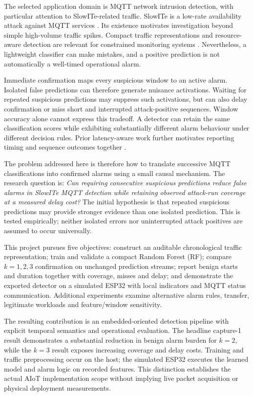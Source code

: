 \documentclass[conference]{IEEEtran}
\begin{document}
The selected application domain is MQTT network intrusion detection,
with particular attention to SlowITe-related traffic. SlowITe is a
low-rate availability attack against MQTT services
\cite{vaccari2020slow}. Its existence motivates investigation beyond
simple high-volume traffic spikes. Compact traffic representations
and resource-aware detection are relevant for constrained monitoring
systems \cite{alfayoumi2023,gavric2024}. Nevertheless, a lightweight
classifier can make mistakes, and a positive prediction is not
automatically a well-timed operational alarm.

Immediate confirmation maps every suspicious window to an active
alarm. Isolated false predictions can therefore generate nuisance
activations. Waiting for repeated suspicious predictions may suppress
such activations, but can also delay confirmation or miss short and
interrupted attack-positive sequences. Window accuracy alone cannot
express this tradeoff. A detector can retain the same classification
scores while exhibiting substantially different alarm behaviour
under different decision rules. Prior latency-aware work further
motivates reporting timing and sequence outcomes together
\cite{puccetti2026}.

The problem addressed here is therefore how to translate successive
MQTT classifications into confirmed alarms using a small causal
mechanism. The research question is: \emph{Can requiring consecutive
suspicious predictions reduce false alarms in SlowITe MQTT detection
while retaining observed attack-run coverage at a measured delay
cost?} The initial hypothesis is that repeated suspicious predictions
may provide stronger evidence than one isolated prediction. This is
tested empirically; neither isolated errors nor uninterrupted attack
positives are assumed to occur universally.

This project pursues five objectives: construct an auditable chronological
traffic representation; train and validate a compact Random Forest
(RF); compare $k=1,2,3$ confirmation on unchanged prediction streams;
report benign starts and duration together with coverage, misses and
delay; and demonstrate the exported detector on a simulated ESP32
with local indicators and MQTT status communication. Additional
experiments examine alternative alarm rules, transfer, legitimate
workloads and feature/window sensitivity.

The resulting contribution is an embedded-oriented detection pipeline
with explicit temporal semantics and operational evaluation. The
headline capture-1 result demonstrates a substantial reduction in
benign alarm burden for $k=2$, while the $k=3$ result exposes increasing
coverage and delay costs. Training and traffic preprocessing occur on
the host; the simulated ESP32 executes the learned model and alarm
logic on recorded features. This distinction establishes the actual
AIoT implementation scope without implying live packet acquisition
or physical deployment measurements.
\end{document}
